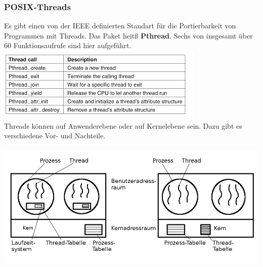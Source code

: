 \documentclass[12pt,a4paper]{univention}
\begin{document}
\subsubsection{POSIX-Threads}
Es gibt einen von der IEEE definierten Standart für die Portierbarkeit von Programmen mit Threads. Das Paket heitß \textbf{Pthread}. Sechs von insgesamt über 60 Funktionsaufrufe sind hier aufgeführt.\\
\includegraphics[scale=1]{pthread.png}\\
Threads können auf Anwenderebene oder auf Kernelebene sein. Dazu gibt es verschiedene Vor- und Nachteile.\\\\
\includegraphics[scale=1.2]{kernelthreads.jpg}\\
\end{document}
